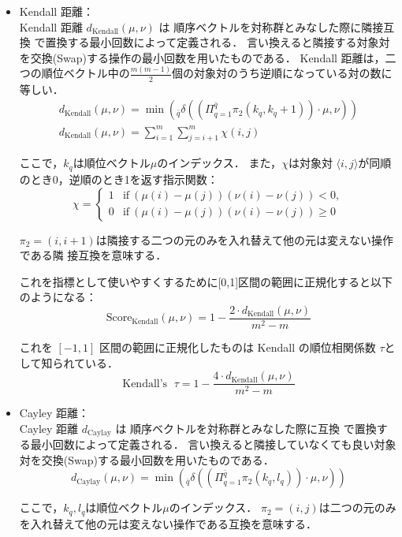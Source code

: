 \documentclass[japanese]{jnlp_1.4}
\newcommand{\argmax}{}
\begin{document}
\begin{itemize}
\item Kendall 距離：\\
Kendall 距離 $d_{\mbox{Kendall}}(\mu,\nu)$ は
順序ベクトルを対称群とみなした際に隣接互換
で置換する最小回数によって定義される．
言い換えると隣接する対象対を交換(Swap)する操作の最小回数を用いたものである．
Kendall 距離は，二つの順位ベクトル中の$\frac{m(m-1)}{2}$個の対象対のうち逆順になっている対の数に等しい．
\begin{gather*}
d_{\mbox{Kendall}}(\mu,\nu) = \min (\argmax_{\bar{q}} \delta((\Pi^{\bar{q}}_{q=1} \pi_{2}(k_{q},k_{q}+1)) \cdot \mu, \nu) ) \\
d_{\mbox{Kendall}}(\mu,\nu) = \sum^{m}_{i=1} \sum^{m}_{j=i+1} \chi (i, j)
\end{gather*}

ここで，$k_{q}$は順位ベクトル$\mu$のインデックス．
また，$\chi$は対象対 $\langle i, j \rangle$が同順のとき0，逆順のとき1を返す指示関数：
\[
\chi = \left\{ \begin{array}{ll}
          1 & \mbox{if}\  (\mu(i)-\mu(j))(\nu(i)-\nu(j)) < 0, \\
          0 & \mbox{if}\  (\mu(i)-\mu(j))(\nu(i)-\nu(j)) \geq 0
          \end{array} \right.
\]

$\pi_{2}=(i,i+1)$は隣接する二つの元のみを入れ替えて他の元は変えない操作である隣
      接互換を意味する．

これを指標として使いやすくするために[0,1]区間の範囲に正規化すると以下のようになる：
\[
\mbox{Score}_{\mbox{Kendall}}(\mu, \nu)  = 1 - \frac{2 \cdot d_{\mbox{Kendall}}(\mu,\nu)}{m^2-m}
\]

これを $[-1,1]$ 区間の範囲に正規化したものは Kendall の順位相関係数 $\tau$として知られている．
\[
\mbox{Kendall's }\; \tau = 1 - \frac{4 \cdot d_{\mbox{Kendall}}(\mu,\nu)}{m^2-m}
\]

\item Cayley 距離：\\
Cayley 距離 $d_{\mbox{Caylay}}$ は
順序ベクトルを対称群とみなした際に互換
で置換する最小回数によって定義される．
言い換えると隣接していなくても良い対象対を交換(Swap)する最小回数を用いたものである．
\newpage
\[
d_{\mbox{Caylay}}(\mu, \nu)  = \min (\argmax_{\bar{q}} \delta((\Pi^{\bar{q}}_{q=1} \pi_{2}(k_{q},l_{q})) \cdot \mu, \nu) )
\]

ここで，$k_{q},l_{q}$は順位ベクトル$\mu$のインデックス．
$\pi_{2}=(i,j)$は二つの元のみを入れ替えて他の元は変えない操作である互換を意味する．


\end{itemize}
\end{document}
